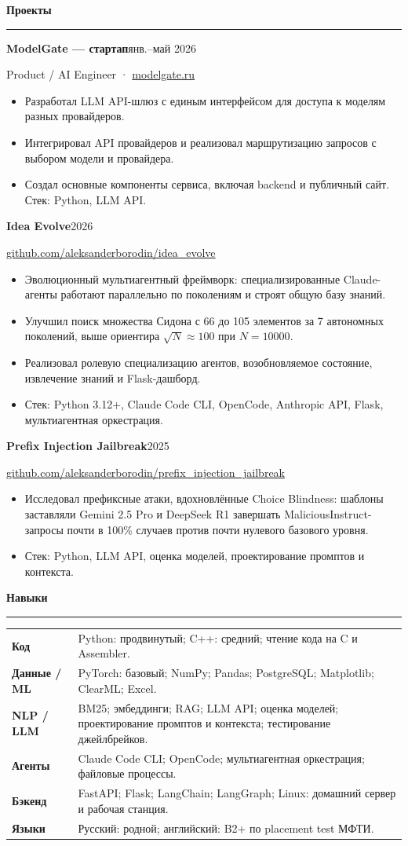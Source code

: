 \documentclass[10pt,a4paper]{article}
\newcommand{\sectiontitle}[1]{%
  \vspace{0.38em}%
  {\normalsize\bfseries\color{accent} #1}\par
  \vspace{0.08em}\hrule\vspace{0.21em}%
}
\newcommand{\entry}[4]{%
  \textbf{#1}\hfill {\color{textgray}#2}\par
  {\color{textgray}#3}\par
  #4\vspace{0.21em}%
}
\begin{document}
\sectiontitle{Проекты}
\entry{ModelGate — стартап}{янв.--май 2026}{Product / AI Engineer · \href{https://modelgate.ru}{modelgate.ru}}{%
\begin{itemize}
  \item Разработал LLM API-шлюз с единым интерфейсом для доступа к моделям разных провайдеров.
  \item Интегрировал API провайдеров и реализовал маршрутизацию запросов с выбором модели и провайдера.
  \item Создал основные компоненты сервиса, включая backend и публичный сайт. Стек: Python, LLM API.
\end{itemize}
}

\entry{Idea Evolve}{2026}{\href{https://github.com/aleksanderborodin/idea_evolve}{github.com/aleksanderborodin/idea\_evolve}}{%
\begin{itemize}
  \item Эволюционный мультиагентный фреймворк: специализированные Claude-агенты работают параллельно по поколениям и строят общую базу знаний.
  \item Улучшил поиск множества Сидона с 66 до 105 элементов за 7 автономных поколений, выше ориентира $\sqrt{N}\approx100$ при $N=10000$.
  \item Реализовал ролевую специализацию агентов, возобновляемое состояние, извлечение знаний и Flask-дашборд.
  \item Стек: Python 3.12+, Claude Code CLI, OpenCode, Anthropic API, Flask, мультиагентная оркестрация.
\end{itemize}
}

\entry{Prefix Injection Jailbreak}{2025}{\href{https://github.com/aleksanderborodin/prefix_injection_jailbreak}{github.com/aleksanderborodin/prefix\_injection\_jailbreak}}{%
\begin{itemize}
  \item Исследовал префиксные атаки, вдохновлённые Choice Blindness: шаблоны заставляли Gemini 2.5 Pro и DeepSeek R1 завершать MaliciousInstruct-запросы почти в 100\% случаев против почти нулевого базового уровня.
  \item Стек: Python, LLM API, оценка моделей, проектирование промптов и контекста.
\end{itemize}
}

\sectiontitle{Навыки}
\begin{tabularx}{\textwidth}{@{}>{\bfseries}p{2.50cm}X@{}}
Код & Python: продвинутый; C++: средний; чтение кода на C и Assembler. \\
Данные / ML & PyTorch: базовый; NumPy; Pandas; PostgreSQL; Matplotlib; ClearML; Excel. \\
NLP / LLM & BM25; эмбеддинги; RAG; LLM API; оценка моделей; проектирование промптов и контекста; тестирование джейлбрейков. \\
Агенты & Claude Code CLI; OpenCode; мультиагентная оркестрация; файловые процессы. \\
Бэкенд & FastAPI; Flask; LangChain; LangGraph; Linux: домашний сервер и рабочая станция. \\
Языки & Русский: родной; английский: B2+ по placement test МФТИ. \\
\end{tabularx}
\end{document}
